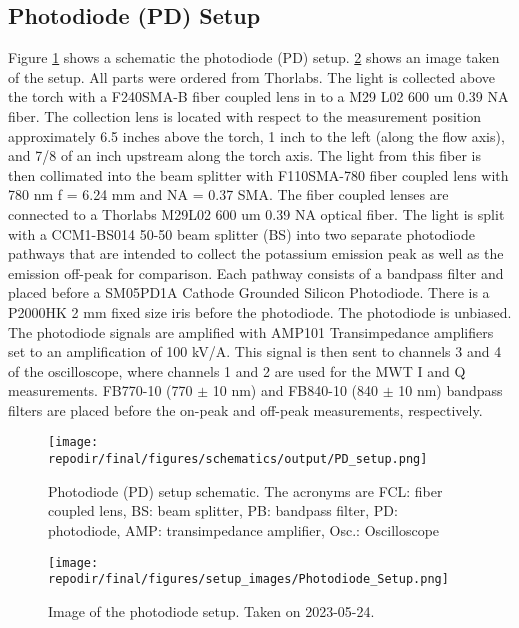 \clearpage
\subsection{Photodiode (PD) Setup}

Figure \ref{fig:SI_PD_setup_schematic} shows a schematic the photodiode (PD) setup. \ref{fig:SI_PD_setup_image} shows an image taken of the setup. All parts were ordered from Thorlabs. The light is collected above the torch with a F240SMA-B fiber coupled lens in to a M29 L02 600 um 0.39 NA fiber. The collection lens is located with respect to the measurement position approximately 6.5 inches above the torch, 1 inch to the left (along the flow axis), and 7/8 of an inch upstream along the torch axis. The light from this fiber is  then collimated into the beam splitter with F110SMA-780 fiber coupled lens with 780 nm f = 6.24 mm and NA = 0.37 SMA. The fiber coupled lenses are connected to a Thorlabs M29L02 600 um 0.39 NA optical fiber. The light is split with a CCM1-BS014 50-50 beam splitter (BS) into two separate photodiode pathways that are intended to collect the potassium emission peak as well as the emission off-peak for comparison. Each pathway consists of a bandpass filter and placed before a SM05PD1A Cathode Grounded Silicon Photodiode. There is a P2000HK 2 mm fixed size iris before the photodiode. The photodiode is unbiased.   The photodiode signals are amplified with AMP101 Transimpedance amplifiers set to an amplification of 100 kV/A. This signal is then sent to channels 3 and 4 of the oscilloscope, where channels 1 and 2 are used for the MWT  I and Q measurements.  FB770-10 (770 $\pm$ 10 nm) and FB840-10 (840 $\pm$ 10 nm) bandpass filters are placed before the on-peak and off-peak measurements, respectively. 



\begin{figure}[]
    \centering
    \texttt{[image: \\repodir/final/figures/schematics/output/PD\_setup.png]}
    \caption{Photodiode (PD) setup schematic. The acronyms are FCL: fiber coupled lens, BS: beam splitter, PB: bandpass filter, PD: photodiode, AMP: transimpedance amplifier, Osc.: Oscilloscope}
    \label{fig:SI_PD_setup_schematic}
\end{figure}



\begin{figure}[]
    \centering
    \texttt{[image: \\repodir/final/figures/setup\_images/Photodiode\_Setup.png]}
    \caption{Image of the photodiode setup. Taken on 2023-05-24. }
    \label{fig:SI_PD_setup_image}
\end{figure}

